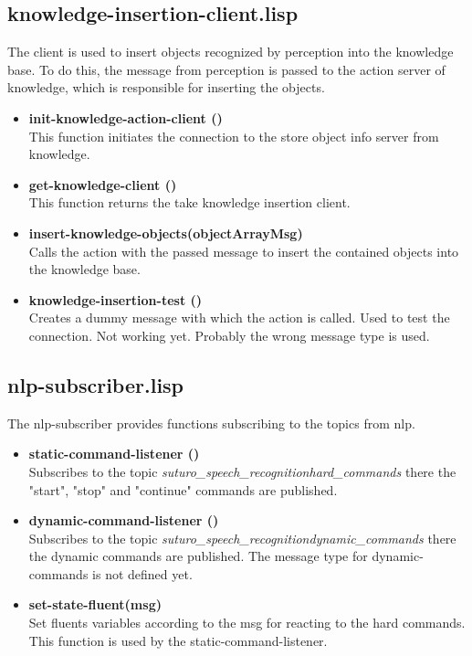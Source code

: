 \documentclass[main.tex]{subfiles}
\begin{document}
        \subsection{knowledge-insertion-client.lisp}
        \label{knowledge-insertion}
        The client is used to insert objects recognized by perception into the knowledge base. To do this, the message from perception is passed to the action server of knowledge, which is responsible for inserting the objects.
        \begin{itemize}
          \item \textbf{init-knowledge-action-client ()} \\
          This function initiates the connection to the store object info server from knowledge.
          \item \textbf{get-knowledge-client ()}  \\
          This function returns the take knowledge insertion client.
          \item \textbf{insert-knowledge-objects(objectArrayMsg)} \\
          Calls the action with the passed message to insert the contained objects into the knowledge base.
          \item \textbf{knowledge-insertion-test ()} \\
          Creates a dummy message with which the action is called. Used to test the connection. Not working yet. Probably the wrong message type is used.
        \end{itemize}
        \subsection{nlp-subscriber.lisp}
        The nlp-subscriber provides functions subscribing to the topics from nlp.
        \begin{itemize}
           \item \textbf{static-command-listener ()} \\
           Subscribes to the topic \textit{suturo\_speech\_recognition\/hard\_commands} there the "start", "stop" and "continue" commands are published.
           \item \textbf{dynamic-command-listener ()} \\
           Subscribes to the topic \textit{suturo\_speech\_recognition\/dynamic\_commands} there the dynamic commands are published. The message type for dynamic-commands is not defined yet.
           \item \textbf{set-state-fluent(msg)} \\
           Set fluents variables according to the msg for reacting to the hard commands. This function is used by the static-command-listener.
         \end{itemize}
\end{document}

